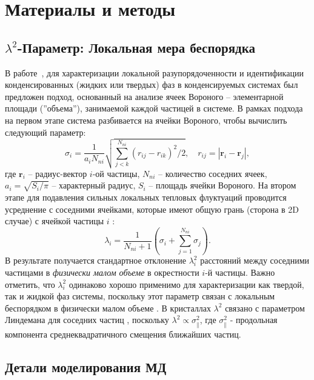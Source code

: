 \section{Материалы и методы}

\subsection{$\lambda^2$-Параметр: Локальная мера беспорядка}
\label{SSMF-AppA}

В работе~\cite{10.1021/acs.jpcc.7b09317}, для характеризации локальной разупорядоченности и идентификации конденсированных (жидких или твердых) фаз в конденсируемых системах был предложен подход, основанный на анализе ячеек Вороного -- элементарной площади (''объема''), занимаемой каждой частицей в системе.
В рамках подхода на первом этапе система разбивается на ячейки Вороного, чтобы вычислить следующий параметр:
\begin{equation}
\label{SSMF-eq1}
\sigma_{i} =\frac{1}{a_i N_{ni}}\sqrt{\sum_{j<k}^{N_{ni}}{(r_{ij}-r_{ik})^2}/2}, \quad r_{ij}=|\mathbf{r}_i-\mathbf{r}_j|,
\end{equation}
где $\mathbf{r}_i$ -- радиус-вектор $i$-ой частицы, $N_{ni}$ -- количество соседних ячеек, $a_i = \sqrt{S_i/\pi}$ -- характерный радиус, $S_i$ -- площадь ячейки Вороного.
На втором этапе для подавления сильных локальных тепловых флуктуаций проводится усреднение с соседними ячейками, которые имеют общую грань (сторона в 2D случае) с ячейкой частицы $i$ \cite{10.1021/acs.jpcc.7b09317}:
\begin{equation}
\label{SSMF-eq2}
\lambda_{i} = \frac{1}{N_{ni}+1}\left(\sigma_{i}+\sum_{j=1}^{N_{ni}}{\sigma_{j}}\right).
\end{equation}
В результате получается стандартное отклонение $\lambda_i^2$ расстояний между соседними частицами в \emph{физически малом объеме} в окрестности $i$-й частицы.
Важно отметить, что $\lambda_i^2$ одинаково хорошо применимо для характеризации как твердой, так и жидкой фаз системы, поскольку этот параметр связан с локальным беспорядком в физически малом объеме \cite{10.1021/acs.jpcc.7b09317}.
В кристаллах $\lambda^2$ связано с параметром Линдемана для соседних частиц \cite{10.1016/0375-9601(85)90617-6}, поскольку $\lambda^2 \propto \sigma_\|^2$, где $\sigma_\|^2$ - продольная компонента среднеквадратичного смещения ближайших частиц.


\subsection{Детали моделирования МД}
\label{SSMF-AppC}

